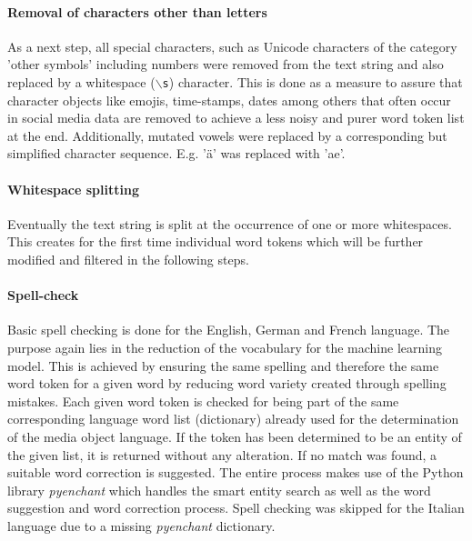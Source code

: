 \paragraph*{Removal of characters other than letters} \label{remove_eveything_but_letters}
As a next step, all special characters, such as Unicode characters of the category 'other symbols' including numbers were removed from the text string and also replaced by a whitespace (\texttt{$\backslash$s}) character. This is done as a measure to assure that character objects like emojis, time-stamps, dates among others that often occur in social media data are removed to achieve a less noisy and purer word token list at the end. Additionally, mutated vowels were replaced by a corresponding but simplified character sequence. E.g. '\"a' was replaced with 'ae'.

\paragraph*{Whitespace splitting} \label{whitespace_splitting}
Eventually the text string is split at the occurrence of one or more whitespaces. This creates for the first time individual word tokens which will be further modified and filtered in the following steps.

\paragraph*{Spell-check} \label{spell_check}
Basic spell checking is done for the English, German and French language. The purpose again lies in the reduction of the vocabulary for the machine learning model. This is achieved by ensuring the same spelling and therefore the same word token for a given word by reducing word variety created through spelling mistakes. Each given word token is checked for being part of the same corresponding language word list (dictionary) already used for the determination of the media object language. If the token has been determined to be an entity of the given list, it is returned without any alteration. If no match was found, a suitable word correction is suggested. The entire process makes use of the Python library \textit{pyenchant} which handles the smart entity search as well as the word suggestion and word correction process. Spell checking was skipped for the Italian language due to a missing \textit{pyenchant} dictionary.


